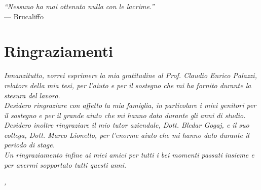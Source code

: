 
\cleardoublepage
{}
{}

\begin{flushright}{
	\slshape    
	``Nessuno ha mai ottenuto nulla con le lacrime.''} \\ 
	\medskip
    --- Brucaliffo
\end{flushright}


\bigskip

\begingroup
\let\clearpage\relax
\let\cleardoublepage\relax
\let\cleardoublepage\relax

\chapter*{Ringraziamenti}

\noindent \textit{Innanzitutto, vorrei esprimere la mia gratitudine al Prof. Claudio Enrico Palazzi, relatore della mia tesi, per l'aiuto e per il sostegno che mi ha fornito durante la stesura del lavoro.}\\

\noindent \textit{Desidero ringraziare con affetto la mia famiglia, in particolare i miei genitori per il sostegno e per il grande aiuto che mi hanno dato durante gli anni di studio.}\\

\noindent \textit{Desidero inoltre ringraziare il mio tutor aziendale, Dott. Bledar Gogaj, e il suo collega, Dott. Marco Lionello, per l'enorme aiuto che mi hanno dato durante il periodo di stage.}\\

\noindent \textit{Un ringraziamento infine ai miei amici per tutti i bei momenti passati insieme e per avermi sopportato tutti questi anni.}\\
\bigskip

\noindent\textit{\myLocation, \myTime}
\hfill \myName

\endgroup

